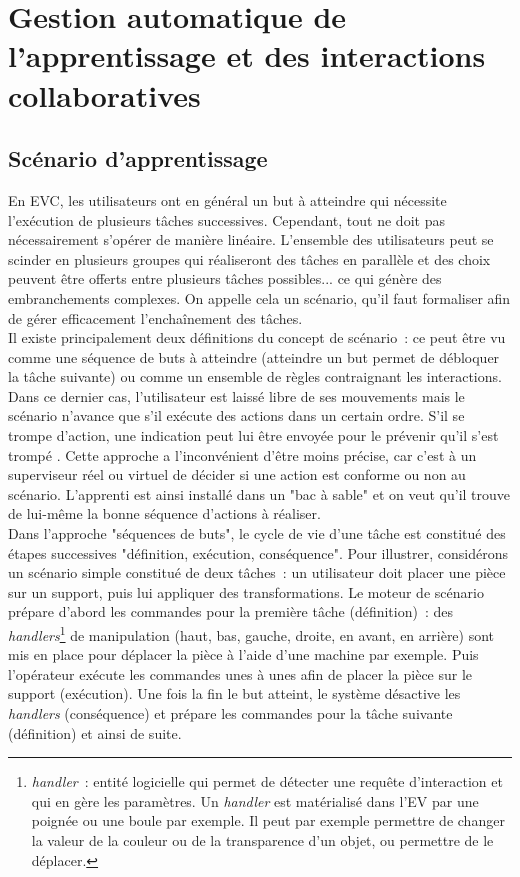 \documentclass[11pt]{article}
\begin{document}
\section{Gestion automatique de l'apprentissage et des interactions collaboratives}

\subsection{Scénario d'apprentissage}
En EVC, les utilisateurs ont en général un but à atteindre qui nécessite l'exécution de plusieurs tâches successives. Cependant, tout ne doit pas nécessairement s'opérer de manière linéaire. L'ensemble des utilisateurs peut se scinder en plusieurs groupes qui réaliseront des tâches en parallèle et des choix peuvent être offerts entre plusieurs tâches possibles... ce qui génère des embranchements complexes. On appelle cela un scénario, qu'il faut formaliser afin de gérer efficacement l'enchaînement des tâches.
\\

Il existe principalement deux définitions du concept de scénario~: ce peut être vu comme une séquence de buts à atteindre \cite{seven} (atteindre un but permet de débloquer la tâche suivante) ou comme un ensemble de règles contraignant les interactions. Dans ce dernier cas, l'utilisateur est laissé libre de ses mouvements mais le scénario n'avance que s'il exécute des actions dans un certain ordre. S'il se trompe d'action, une indication peut lui être envoyée pour le prévenir qu'il s'est trompé \cite{constrained-scenario}. Cette approche a l'inconvénient d'être moins précise, car c'est à un superviseur réel ou virtuel de décider si une action est conforme ou non au scénario. L'apprenti est ainsi installé dans un "bac à sable" et on veut qu'il trouve de lui-même la bonne séquence d'actions à réaliser.
\\

Dans l'approche "séquences de buts", le cycle de vie d'une tâche est constitué des étapes successives "définition, exécution, conséquence". Pour illustrer, considérons un scénario simple constitué de deux tâches~: un utilisateur doit placer une pièce sur un support, puis lui appliquer des transformations. Le moteur de scénario prépare d'abord les commandes pour la première tâche (définition)~: des \textit{handlers}\footnote{\textit{handler}~: entité logicielle qui permet de détecter une requête d'interaction et qui en gère les paramètres. Un \textit{handler} est matérialisé dans l'EV par une poignée ou une boule par exemple. Il peut par exemple permettre de changer la valeur de la couleur ou de la transparence d'un objet, ou permettre de le déplacer.} de manipulation (haut, bas, gauche, droite, en avant, en arrière) sont mis en place pour déplacer la pièce à l'aide d'une machine par exemple. Puis l'opérateur exécute les commandes unes à unes afin de placer la pièce sur le support (exécution). Une fois la fin le but atteint, le système désactive les \textit{handlers} (conséquence) et prépare les commandes pour la tâche suivante (définition) et ainsi de suite.
\\
\end{document}
